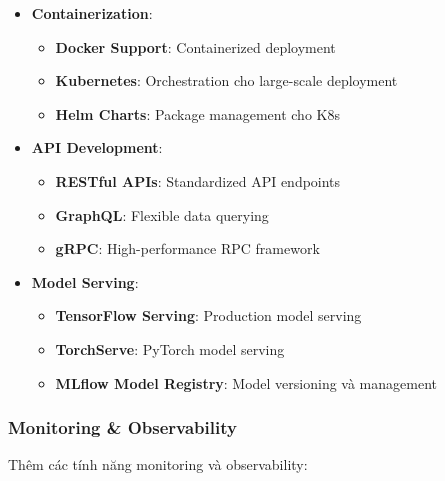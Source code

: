 \begin{itemize}
    \item \textbf{Containerization}:
    \begin{itemize}
        \item \textbf{Docker Support}: Containerized deployment
        \item \textbf{Kubernetes}: Orchestration cho large-scale deployment
        \item \textbf{Helm Charts}: Package management cho K8s
    \end{itemize}
    
    \item \textbf{API Development}:
    \begin{itemize}
        \item \textbf{RESTful APIs}: Standardized API endpoints
        \item \textbf{GraphQL}: Flexible data querying
        \item \textbf{gRPC}: High-performance RPC framework
    \end{itemize}
    
    \item \textbf{Model Serving}:
    \begin{itemize}
        \item \textbf{TensorFlow Serving}: Production model serving
        \item \textbf{TorchServe}: PyTorch model serving
        \item \textbf{MLflow Model Registry}: Model versioning và management
    \end{itemize}
\end{itemize}

\subsubsection{Monitoring \& Observability}

Thêm các tính năng monitoring và observability:

